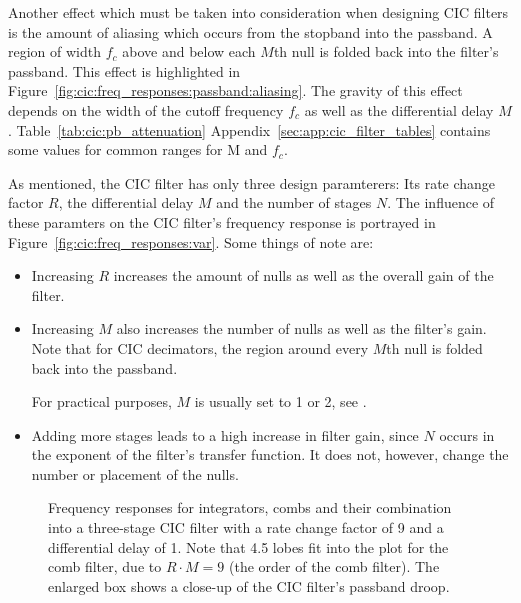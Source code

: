 Another  effect which  must be  taken  into consideration  when designing  CIC
filters  is  the amount  of  aliasing  which  occurs  from the  stopband  into
the  passband. A  region of  width  $f_c$  above  and  below each  $M$th  null
is  folded  back  into  the  filter's  passband. This  effect  is  highlighted
in  Figure~\ref{fig:cic:freq_responses:passband:aliasing}.    The  gravity  of
this  effect  depends   on  the  width  of  the  cutoff   frequency  $f_c$  as
well   as  the   differential  delay   $M$. Table~\ref{tab:cic:pb_attenuation}
Appendix~\ref{sec:app:cic_filter_tables}  contains  some   values  for  common
ranges for M and $f_c$.

As  mentioned, the  CIC filter  has  only three  design paramterers: Its  rate
change factor  $R$, the differential delay  $M$ and the number  of stages $N$.
The influence  of these paramters  on the  CIC filter's frequency  response is
portrayed in Figure~\ref{fig:cic:freq_responses:var}. Some things of note are:
\begin{itemize}\tightlist
    \item
        Increasing $R$  increases the amount of  nulls as well as  the overall
        gain of the filter.
    \item
        Increasing  $M$ also  increases the  number of  nulls as  well as  the
        filter's gain.  Note that for  CIC decimators, the region around every
        $M$th null is folded back into the passband.

        For practical purposes, $M$ is usually  set to \num{1} or \num{2}, see
        \cite{1163535}.
    \item
        Adding more stages leads to a  high increase in filter gain, since $N$
        occurs in the exponent of the filter's transfer function. It does not,
        however, change the number or placement of the nulls.
\end{itemize}

\begin{figure}
    \centering
        
        \caption[Frequency Responses for Integrators, Combs and CIC Filters]{%
            Frequency responses  for integrators, combs and  their combination
            into a three-stage CIC filter with a rate change factor of \num{9}
            and a  differential delay of  \num{1}.  Note that  \num{4.5} lobes
            fit into the plot for the comb  filter, due to $R\cdot M = 9$ (the
            order of the  comb filter).  The enlarged box shows  a close-up of
            the CIC filter's passband droop.%
        }
        \label{fig:cic:freq_responses}
\end{figure}

